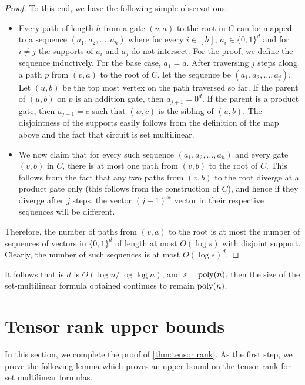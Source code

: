 \begin{proof}
To this end, we have the following simple observations:
\begin{itemize}
\item Every path of length $h$ from a gate $(v, a)$ to the root in $C$
  can be mapped to a sequence $(a_1, a_2, \ldots, a_h)$ where for every $i \in [h]$, $a_i \in \{0,1\}^d$ and for $i\neq j$ the supports of $a_i$ and $a_j$ do not intersect.
For the proof, we define the sequence inductively.
For the base case, $a_1 = a$.
After traversing $j$ steps along a path $p$ from $(v,a)$ to the root of $C$, let the sequence be $(a_1, a_2, \ldots, a_j)$.
Let $(u, b)$ be the top most vertex on the path traversed so far.
If the parent of $(u, b)$ on $p$ is an addition gate, then $a_{j+1} = 0^d$.
If the parent is a product gate, then $a_{j+1} = c$ such that $(w,c)$ is the sibling of $(u,b)$.
The disjointness of the supports easily follows from the definition of the map above and the fact that circuit is set multilinear.

\item We now claim that for every such sequence $(a_1, a_2, \ldots,
  a_h)$ and every gate $(v,b)$ in $C$, there is at most one path from $(v,b)$ to the root of $C$.
This follows from the fact that any two paths from $(v,b)$ to the root diverge at a product gate only (this follows from the construction of $C$), and hence if they diverge after $j$ steps, the vector $(j+1)^{st}$ vector in their respective sequences will be different.
\end{itemize}

Therefore, the number of paths from $(v,a)$ to the root is at most the number of sequences of vectors in $\{0,1\}^d$ of length at most $O(\log s)$ with disjoint support.
Clearly, the number of such sequences is at most $O(\log s)^d$.
\end{proof}

\begin{remark} 
  It follows that is $d$ is $O\left(\log n/\log \log n\right)$, and $s = \operatorname{poly}(n)$, then the size of the set-multilinear formula obtained continues to remain $\operatorname{poly}(n)$.
\end{remark}
\section{Tensor rank upper bounds}

In this section, we complete the proof of \autoref{thm:tensor rank}.
As the first step, we prove the following lemma which proves an upper bound on the tensor rank for set multilinear formulas.

